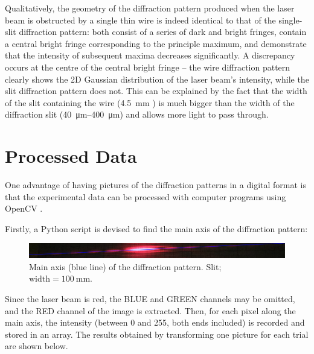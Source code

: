 \documentclass[a4paper, 12pt]{article}
\begin{document}
Qualitatively, the geometry of the diffraction pattern produced when the laser beam is obstructed by a single thin wire is indeed identical to that of the single-slit diffraction pattern: both consist of a series of dark and bright fringes, contain a central bright fringe corresponding to the principle maximum, and demonstrate that the intensity of subsequent maxima decreases significantly. A discrepancy occurs at the centre of the central bright fringe -- the wire diffraction pattern clearly shows the 2D Gaussian distribution of the laser beam's intensity, while the slit diffraction pattern does not. This can be explained by the fact that the width of the slit containing the wire (\SI{4.5}{\mm} \cite{wire_measurement}) is much bigger than the width of the diffraction slit (\SI{40}{\um}--\SI{400}{\um}) and allows more light to pass through.


\section*{Processed Data}
One advantage of having pictures of the diffraction patterns in a digital format is that the experimental data can be processed with computer programs using OpenCV \cite{opencv_library}.

Firstly, a Python script \cite{py_extract} is devised to find the main axis of the diffraction pattern:

\begin{figure}[H]
    \centering
    \includegraphics[width=\textwidth]{scripts/processed-data/axis}
    \caption{Main axis (blue line) of the diffraction pattern. Slit; $\text{width} = \SI{100}{\mm}$. }
    \label{fig:mains-axis}
\end{figure}

Since the laser beam is red, the BLUE and GREEN channels may be omitted, and the RED channel of the image is extracted. Then, for each pixel along the main axis, the intensity (between 0 and 255, both ends included) is recorded and stored in an array. The results obtained by transforming one picture for each trial are shown below. 
\end{document}
